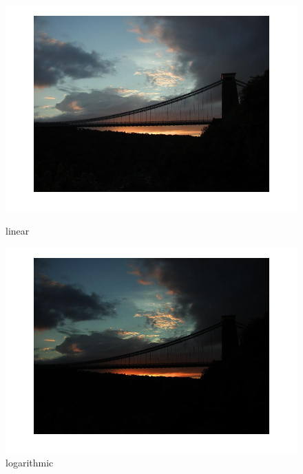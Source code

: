 {        
      \begin{figure}[!htb]
      	\includegraphics[width=\linewidth]{images/linearhdr3}
      	\caption{linear}\label{fig:logtonemap}
      	\endminipage\hfill
      	\includegraphics[width=\linewidth]{images/loghdr3}
      	\caption{logarithmic}\label{fig:lineartonemap}
      	\endminipage\hfill
      \end{figure}
      
}
